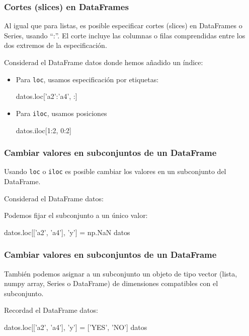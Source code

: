 \documentclass[9pt]{beamer}
\begin{document}
\begin{frame}[fragile]
  \frametitle{Cortes (slices) en DataFrames}
  \begin{block}{}
    Al igual que para listas, es posible especificar cortes (slices) en DataFrames o Series, usando ``:''. El corte incluye las columnas o filas comprendidas entre los dos extremos de la especificación. 
  \end{block}\pause
  Considerad el DataFrame datos donde hemos añadido un índice:\smallskip
  
{\footnotesize
  }
 
  \begin{itemize}
  \item<3-> Para {\tt loc}, usamos especificación por etiquetas:
    \begin{pyconsole}
datos.loc['a2':'a4', :]
    \end{pyconsole}
  \item<4-> Para {\tt iloc}, usamos posiciones
    \begin{pyconsole}
datos.iloc[1:2, 0:2]
    \end{pyconsole}
  \end{itemize}
\end{frame}
\begin{frame}[fragile]
  \frametitle{Cambiar valores en subconjuntos de un DataFrame}
  \begin{block}{}
    Usando {\tt loc} o {\tt iloc} es posible cambiar los valores en un subconjunto del DataFrame.
  \end{block}
 \pause
  Considerad el DataFrame datos:\smallskip
  
{\footnotesize
  }
\pause

Podemos fijar el subconjunto a un único valor:
   \begin{pyconsole}
datos.loc[['a2', 'a4'], 'y'] = np.NaN
datos
    \end{pyconsole}
\end{frame}
\begin{frame}[fragile]
  \frametitle{Cambiar valores en subconjuntos de un DataFrame}
  \begin{block}{}
    También podemos asignar a un subconjunto un objeto de tipo vector (lista, numpy array, Series o DataFrame) de dimensiones compatibles con el subconjunto.
  \end{block}
Recordad  el DataFrame datos:\smallskip
  
{\footnotesize
  }
\pause



   \begin{pyconsole}
datos.loc[['a2', 'a4'], 'y'] = ['YES', 'NO']
datos
    \end{pyconsole}
\end{frame}
\end{document}
